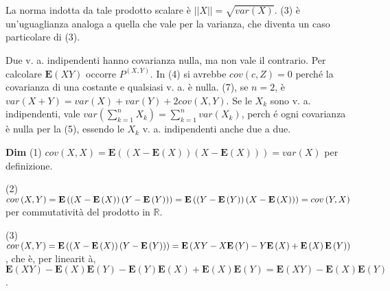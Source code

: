 \documentclass{article}
\begin{document}
La norma indotta da tale prodotto scalare \`{e} $\left\vert \left\vert
X\right\vert \right\vert =\sqrt{var\left( X\right) }$. (3) \`{e}
un'uguaglianza analoga a quella che vale per la varianza, che diventa un
caso particolare di (3).

Due v. a. indipendenti hanno covarianza nulla, ma non vale il contrario. Per
calcolare $\mathbf{E}\left( XY\right) $ occorre $P^{\left( X,Y\right) }$. In
(4) si avrebbe $cov\left( c,Z\right) =0$ perch\'{e} la covarianza di una
costante e qualsiasi v. a. \`{e} nulla. (7), se $n=2$, \`{e} $var\left(
X+Y\right) =var\left( X\right) +var\left( Y\right) +2cov\left( X,Y\right) $.
Se le $X_{k}$ sono v. a. indipendenti, vale $var\left(
\sum_{k=1}^{n}X_{k}\right) =\sum_{k=1}^{n}var\left( X_{k}\right) $, perch%
\'{e} ogni covarianza \`{e} nulla per la (5), essendo le $X_{k}$ v. a.
indipendenti anche due a due.

\textbf{Dim} (1) $cov\left( X,X\right) =\mathbf{E}\left( \left( X-\mathbf{E}%
\left( X\right) \right) \left( X-\mathbf{E}\left( X\right) \right) \right)
=var\left( X\right) $ per definizione.

(2) $cov\left( X,Y\right) =\mathbf{E}\left( \left( X-\mathbf{E}\left(
X\right) \right) \left( Y-\mathbf{E}\left( Y\right) \right) \right) =\mathbf{%
E}\left( \left( Y-\mathbf{E}\left( Y\right) \right) \left( X-\mathbf{E}%
\left( X\right) \right) \right) =cov\left( Y,X\right) $ per commutativit\`{a}
del prodotto in $%
\mathbb{R}
$.

(3) $cov\left( X,Y\right) =\mathbf{E}\left( \left( X-\mathbf{E}\left(
X\right) \right) \left( Y-\mathbf{E}\left( Y\right) \right) \right) =\mathbf{%
E}\left( XY-X\mathbf{E}\left( Y\right) -Y\mathbf{E}\left( X\right) +\mathbf{E%
}\left( X\right) \mathbf{E}\left( Y\right) \right) $, che \`{e}, per linearit%
\`{a}, $\mathbf{E}\left( XY\right) -\mathbf{E}\left( X\right) \mathbf{E}%
\left( Y\right) -\mathbf{E}\left( Y\right) \mathbf{E}\left( X\right) +%
\mathbf{E}\left( X\right) \mathbf{E}\left( Y\right) =\mathbf{E}\left(
XY\right) -\mathbf{E}\left( X\right) \mathbf{E}\left( Y\right) $.
\end{document}
